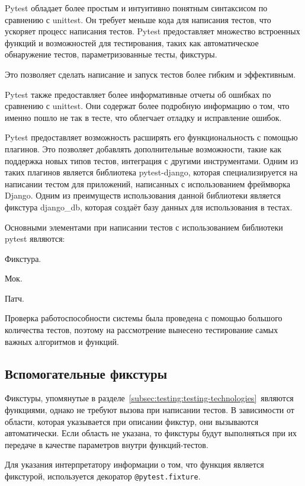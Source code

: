Pytest обладает более простым и интуитивно понятным синтаксисом по сравнению с unittest.
Он требует меньше кода для написания тестов, что ускоряет процесс написания тестов.
Pytest предоставляет множество встроенных функций и возможностей для тестирования, таких как
автоматическое обнаружение тестов, параметризованные тесты, фикстуры.

Это позволяет сделать написание и запуск тестов более гибким и эффективным.

Pytest также предоставляет более информативные отчеты об ошибках по сравнению с unittest.
Они содержат более подробную информацию о том, что именно пошло не так в тесте, что облегчает отладку и исправление ошибок.

Pytest предоставляет возможность расширять его функциональность с помощью плагинов.
Это позволяет добавлять дополнительные возможности, такие как поддержка новых типов тестов, интеграция с другими инструментами.
Одним из таких плагинов является библиотека pytest-django, которая специализируется на написании тестом для приложений, написанных с использованием фреймворка Django.
Одним из преимуществ использования данной библиотеки является фикстура django_db, которая создаёт базу данных для использования в тестах.

Основными элементами при написании тестов с использованием библиотеки pytest являются:
\begin{enumerate_num}
    \item Фикстура.
    \item Мок.
    \item Патч.
\end{enumerate_num}

Проверка работоспособности системы была проведена с помощью большого количества тестов, поэтому на рассмотрение вынесено тестирование самых важных алгоритмов и функций.

\subsection{Вспомогательные фикстуры}\label{subsec:testing:fixtures}
Фикстуры, упомянутые в разделе~\ref{subsec:testing:testing-technologies}~являются функциями, однако не требуют вызова при написании тестов.
В зависимости от области, которая указывается при описании фикстур, они вызываются автоматически.
Если область не указана, то фикстуры будут выполняться при их передаче в качестве параметров внутри функций-тестов.

Для указания интерпретатору информации о том, что функция является фикстурой, используется декоратор \lstinline{@pytest.fixture}.


